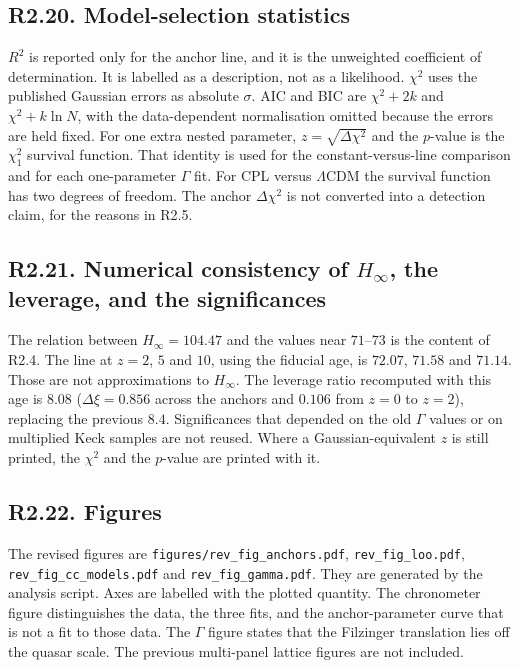 \documentclass[11pt]{article}
\begin{document}
\subsection*{R2.20. Model-selection statistics}

$R^{2}$ is reported only for the anchor line, and it is the unweighted coefficient of determination.
It is labelled as a description, not as a likelihood.
$\chi^{2}$ uses the published Gaussian errors as absolute $\sigma$.
AIC and BIC are $\chi^{2}+2k$ and $\chi^{2}+k\ln N$, with the data-dependent normalisation omitted because the errors are held fixed.
For one extra nested parameter, $z=\sqrt{\Delta\chi^{2}}$ and the $p$-value is the $\chi^{2}_{1}$ survival function.
That identity is used for the constant-versus-line comparison and for each one-parameter $\Gamma$ fit.
For CPL versus $\Lambda$CDM the survival function has two degrees of freedom.
The anchor $\Delta\chi^{2}$ is not converted into a detection claim, for the reasons in R2.5.

\subsection*{R2.21. Numerical consistency of $H_{\infty}$, the leverage, and the significances}

The relation between $H_{\infty}=104.47$ and the values near $71$--$73$ is the content of R2.4.
The line at $z=2$, $5$ and $10$, using the fiducial age, is $72.07$, $71.58$ and $71.14$.
Those are not approximations to $H_{\infty}$.
The leverage ratio recomputed with this age is $8.08$ ($\Delta\xi=0.856$ across the anchors and $0.106$ from $z=0$ to $z=2$), replacing the previous $8.4$.
Significances that depended on the old $\Gamma$ values or on multiplied Keck samples are not reused.
Where a Gaussian-equivalent $z$ is still printed, the $\chi^{2}$ and the $p$-value are printed with it.

\subsection*{R2.22. Figures}

The revised figures are \texttt{figures/rev\_fig\_anchors.pdf}, \texttt{rev\_fig\_loo.pdf}, \texttt{rev\_fig\_cc\_models.pdf} and \texttt{rev\_fig\_gamma.pdf}.
They are generated by the analysis script.
Axes are labelled with the plotted quantity.
The chronometer figure distinguishes the data, the three fits, and the anchor-parameter curve that is not a fit to those data.
The $\Gamma$ figure states that the Filzinger translation lies off the quasar scale.
The previous multi-panel lattice figures are not included.
\end{document}
